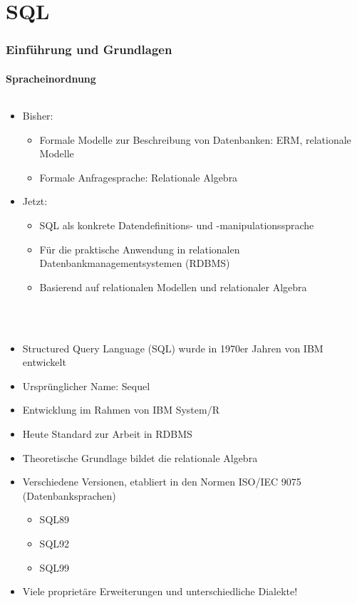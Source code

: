 \part{SQL}
\label{part:sql}

\section{Einf\"uhrung und Grundlagen}

\subsection{Spracheinordnung}

\begin{frame}[t]\frametitle{\insertsection}
\framesubtitle{\insertsubsection}
\begin{itemize}
	\item Bisher: 
	\begin{itemize}
		\item Formale Modelle zur Beschreibung von Datenbanken: ERM, relationale Modelle
		\item Formale Anfragesprache: Relationale Algebra
	\end{itemize}
	\abs
	\item Jetzt: 
	\begin{itemize}
		\item SQL als konkrete Datendefinitions- und -manipulationssprache
		\item F\"ur die praktische Anwendung in relationalen Datenbankmanagementsystemen (RDBMS)
		\item Basierend auf relationalen Modellen und relationaler Algebra
	\end{itemize}	
\end{itemize}
\end{frame}

\begin{frame}[t]\frametitle{\insertsection}
	\framesubtitle{\insertsubsection}
	\\[4pt]
	\begin{itemize}
		\item Structured Query Language (SQL) wurde in 1970er Jahren von IBM entwickelt
		\item Ursprünglicher Name: Sequel
		\item Entwicklung im Rahmen von IBM System/R
		\item Heute Standard zur Arbeit in RDBMS
		\item Theoretische Grundlage bildet die relationale Algebra
		\item Verschiedene Versionen, etabliert in den Normen ISO/IEC 9075 (Datenbanksprachen)
		\begin{itemize}
			\item SQL89
			\item SQL92
			\item SQL99
		\end{itemize}
		\item Viele proprietäre Erweiterungen und unterschiedliche Dialekte!
	\end{itemize}
\end{frame}

